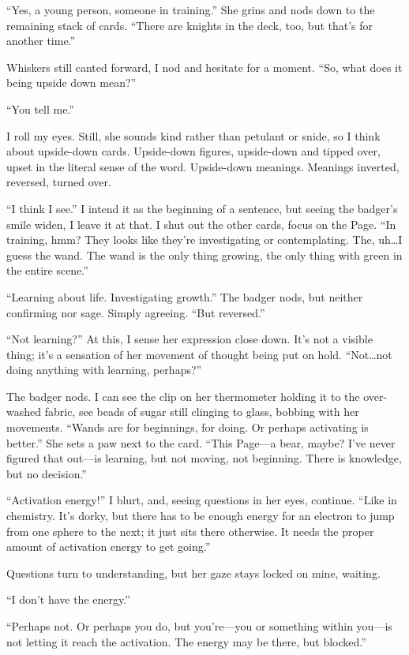 ``Yes, a young person, someone in training.'' She grins and nods down to the remaining stack of cards. ``There are knights in the deck, too, but that's for another time.''

Whiskers still canted forward, I nod and hesitate for a moment. ``So, what does it being upside down mean?''

``You tell me.''

I roll my eyes. Still, she sounds kind rather than petulant or snide, so I think about upside-down cards. Upside-down figures, upside-down and tipped over, upset in the literal sense of the word. Upside-down meanings. Meanings inverted, reversed, turned over.

``I think I see.'' I intend it as the beginning of a sentence, but seeing the badger's smile widen, I leave it at that. I shut out the other cards, focus on the Page. ``In training, hmm? They looks like they're investigating or contemplating. The, uh\ldots{}I guess the wand. The wand is the only thing growing, the only thing with green in the entire scene.''

``Learning about life. Investigating growth.'' The badger nods, but neither confirming nor sage. Simply agreeing. ``But reversed.''

``Not learning?'' At this, I sense her expression close down. It's not a visible thing; it's a sensation of her movement of thought being put on hold. ``Not\ldots{}not doing anything with learning, perhaps?''

The badger nods. I can see the clip on her thermometer holding it to the over-washed fabric, see beads of sugar still clinging to glass, bobbing with her movements. ``Wands are for beginnings, for doing. Or perhaps activating is better.'' She sets a paw next to the card. ``This Page---a bear, maybe? I've never figured that out---is learning, but not moving, not beginning. There is knowledge, but no decision.''

``Activation energy!'' I blurt, and, seeing questions in her eyes, continue. ``Like in chemistry. It's dorky, but there has to be enough energy for an electron to jump from one sphere to the next; it just sits there otherwise. It needs the proper amount of activation energy to get going.''

Questions turn to understanding, but her gaze stays locked on mine, waiting.

``I don't have the energy.''

``Perhaps not. Or perhaps you do, but you're---you or something within you---is not letting it reach the activation. The energy may be there, but blocked.''

